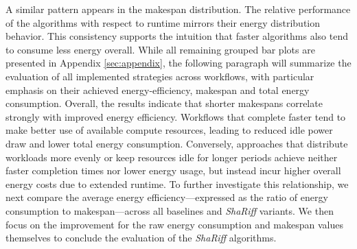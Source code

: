A similar pattern appears in the makespan distribution. The relative performance of the algorithms with respect to runtime mirrors their energy distribution behavior. This consistency supports the intuition that faster algorithms also tend to consume less energy overall.
While all remaining grouped bar plots are presented in Appendix \ref{sec:appendix}, the following paragraph will summarize the evaluation of all implemented strategies across workflows, with particular emphasis on their achieved energy-efficiency, makespan and total energy consumption.
Overall, the results indicate that shorter makespans correlate strongly with improved energy efficiency. Workflows that complete faster tend to make better use of available compute resources, leading to reduced idle power draw and lower total energy consumption. Conversely, approaches that distribute workloads more evenly or keep resources idle for longer periods achieve neither faster completion times nor lower energy usage, but instead incur higher overall energy costs due to extended runtime.
To further investigate this relationship, we next compare the average energy efficiency—expressed as the ratio of energy consumption to makespan—across all baselines and \textit{ShaRiff} variants. We then focus on the improvement for the raw energy consumption and makespan values themselves to conclude the evaluation of the \textit{ShaRiff} algorithms.

